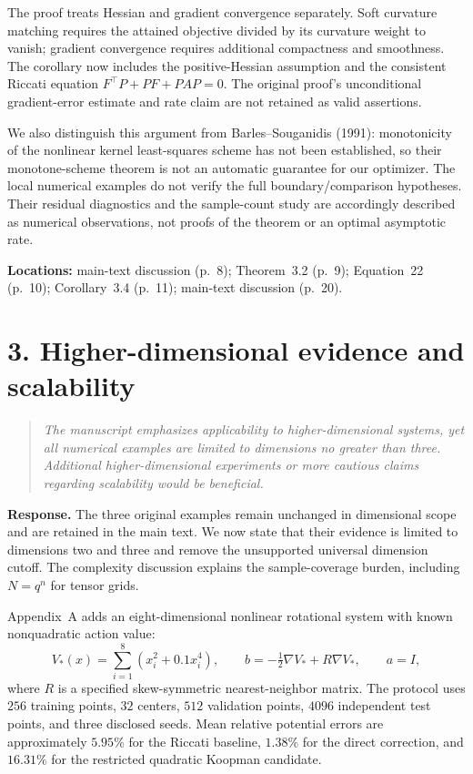 \documentclass[11pt]{article}
\newcommand{\comment}[1]{\begin{quote}\small\itshape #1\end{quote}}
\begin{document}
The proof treats Hessian and gradient convergence separately. Soft curvature matching requires the attained objective divided by its curvature weight to vanish; gradient convergence requires additional compactness and smoothness. The corollary now includes the positive-Hessian assumption and the consistent Riccati equation $F^\top P+PF+PAP=0$. The original proof's unconditional gradient-error estimate and rate claim are not retained as valid assertions.

We also distinguish this argument from Barles--Souganidis (1991): monotonicity of the nonlinear kernel least-squares scheme has not been established, so their monotone-scheme theorem is not an automatic guarantee for our optimizer. The local numerical examples do not verify the full boundary/comparison hypotheses. Their residual diagnostics and the sample-count study are accordingly described as numerical observations, not proofs of the theorem or an optimal asymptotic rate.

\textbf{Locations:} main-text discussion (p.~8); Theorem~3.2 (p.~9); Equation~22 (p.~10); Corollary~3.4 (p.~11); main-text discussion (p.~20).

\section*{3. Higher-dimensional evidence and scalability}
\comment{The manuscript emphasizes applicability to higher-dimensional systems, yet all numerical examples are limited to dimensions no greater than three. Additional higher-dimensional experiments or more cautious claims regarding scalability would be beneficial.}

\textbf{Response.} The three original examples remain unchanged in dimensional scope and are retained in the main text. We now state that their evidence is limited to dimensions two and three and remove the unsupported universal dimension cutoff. The complexity discussion explains the sample-coverage burden, including $N=q^n$ for tensor grids.

Appendix~A adds an eight-dimensional nonlinear rotational system with known nonquadratic action value:
\[
 V_*(x)=\sum_{i=1}^8(x_i^2+0.1x_i^4),\qquad
 b=-\tfrac12\nabla V_*+R\nabla V_*,\qquad a=I,
\]
where $R$ is a specified skew-symmetric nearest-neighbor matrix. The protocol uses $256$ training points, $32$ centers, $512$ validation points, $4096$ independent test points, and three disclosed seeds. Mean relative potential errors are approximately $5.95\%$ for the Riccati baseline, $1.38\%$ for the direct correction, and $16.31\%$ for the restricted quadratic Koopman candidate.
\end{document}
